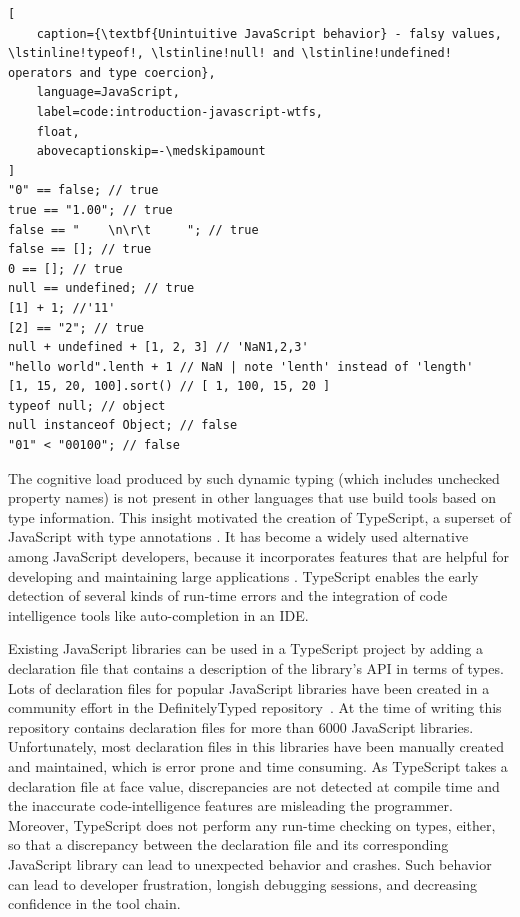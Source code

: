 \documentclass[a4paper,english,cleveref, autoref]{lipics-v2019}
\begin{document}
\begin{lstlisting}[
    caption={\textbf{Unintuitive JavaScript behavior} - falsy values, \lstinline!typeof!, \lstinline!null! and \lstinline!undefined! operators and type coercion},
    language=JavaScript,
	label=code:introduction-javascript-wtfs,
    float,
    abovecaptionskip=-\medskipamount
]
"0" == false; // true
true == "1.00"; // true
false == "    \n\r\t     "; // true
false == []; // true
0 == []; // true
null == undefined; // true
[1] + 1; //'11'
[2] == "2"; // true
null + undefined + [1, 2, 3] // 'NaN1,2,3'
"hello world".lenth + 1 // NaN | note 'lenth' instead of 'length'
[1, 15, 20, 100].sort() // [ 1, 100, 15, 20 ]
typeof null; // object
null instanceof Object; // false
"01" < "00100"; // false
\end{lstlisting}

The cognitive load produced by such dynamic typing (which includes
unchecked property names) is not present in other languages that use
build tools based on type information. This insight motivated the
creation of TypeScript, a superset of JavaScript with type
annotations \cite{typescript}. It has become a widely used alternative
among JavaScript developers, because it incorporates features that are
helpful for developing and maintaining large applications
\cite{DBLP:conf/icse/GaoBB17}. TypeScript enables the early detection
of several kinds of run-time errors and the integration of code intelligence
tools like auto-completion in an IDE.

Existing JavaScript libraries can be used in a TypeScript project by
adding a declaration file that contains a description of the library's
API in terms of types. Lots of declaration files for popular
JavaScript libraries have been created in a community effort in the
DefinitelyTyped repository~\cite{definitely-typed-repository}.
At the time of writing this repository contains declaration files for
more than 6000 JavaScript libraries. Unfortunately, most declaration
files in this libraries have been manually created and maintained,
which is error prone and time consuming. As TypeScript takes a
declaration file at face value, discrepancies are not detected at
compile time and the inaccurate code-intelligence features are misleading the
programmer. Moreover, TypeScript does not perform any run-time 
checking on types, either, so that a discrepancy  between the declaration file
and its corresponding JavaScript library can lead to unexpected 
behavior and crashes. Such behavior can lead to developer
frustration, longish debugging sessions, and decreasing confidence in
the tool chain.
\end{document}
